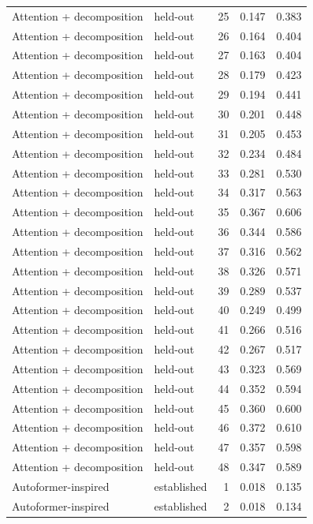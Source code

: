 \begin{tabular}{llrrr}
Attention + decomposition & held-out & 25 & 0.147 & 0.383 \\
Attention + decomposition & held-out & 26 & 0.164 & 0.404 \\
Attention + decomposition & held-out & 27 & 0.163 & 0.404 \\
Attention + decomposition & held-out & 28 & 0.179 & 0.423 \\
Attention + decomposition & held-out & 29 & 0.194 & 0.441 \\
Attention + decomposition & held-out & 30 & 0.201 & 0.448 \\
Attention + decomposition & held-out & 31 & 0.205 & 0.453 \\
Attention + decomposition & held-out & 32 & 0.234 & 0.484 \\
Attention + decomposition & held-out & 33 & 0.281 & 0.530 \\
Attention + decomposition & held-out & 34 & 0.317 & 0.563 \\
Attention + decomposition & held-out & 35 & 0.367 & 0.606 \\
Attention + decomposition & held-out & 36 & 0.344 & 0.586 \\
Attention + decomposition & held-out & 37 & 0.316 & 0.562 \\
Attention + decomposition & held-out & 38 & 0.326 & 0.571 \\
Attention + decomposition & held-out & 39 & 0.289 & 0.537 \\
Attention + decomposition & held-out & 40 & 0.249 & 0.499 \\
Attention + decomposition & held-out & 41 & 0.266 & 0.516 \\
Attention + decomposition & held-out & 42 & 0.267 & 0.517 \\
Attention + decomposition & held-out & 43 & 0.323 & 0.569 \\
Attention + decomposition & held-out & 44 & 0.352 & 0.594 \\
Attention + decomposition & held-out & 45 & 0.360 & 0.600 \\
Attention + decomposition & held-out & 46 & 0.372 & 0.610 \\
Attention + decomposition & held-out & 47 & 0.357 & 0.598 \\
Attention + decomposition & held-out & 48 & 0.347 & 0.589 \\
Autoformer-inspired & established & 1 & 0.018 & 0.135 \\
Autoformer-inspired & established & 2 & 0.018 & 0.134 \\

\end{tabular}
